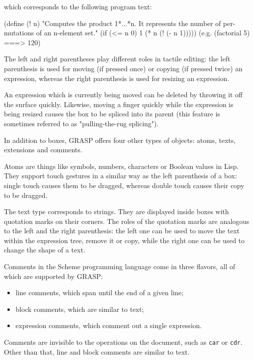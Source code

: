 \documentclass[sigconf]{acmart}
\newenvironment{Snippet}{\Verbatim[samepage=true]}{\endVerbatim}
\begin{document}
which corresponds to the following program text:

\begin{Snippet}
(define (! n)
"Computes the product 1*...*n.
It represents the number of per-
mutations of an n-element set."
  (if (<= n 0)
      1
      (* n (! (- n 1))))) 
(e.g. (factorial 5) ===> 120)
\end{Snippet}

The left and right parentheses play different roles in 
tactile editing: the left parenthesis is used for moving
(if pressed once) or copying (if pressed twice) an expression,
whereas the right parenthesis is used for resizing an expression.

An expression which is currently being moved can be deleted
by throwing it off the surface quickly. Likewise, moving
a finger quickly while the expression is being resized
causes the box to be spliced into its parent (this feature
is sometimes referred to as "pulling-the-rug splicing").

In addition to boxes, GRASP offers four other types
of objects: atoms, texts, extensions and comments.

Atoms are things like symbols, numbers, characters
or Boolean values in Lisp. They support touch
gestures in a similar way as the left parenthesis
of a box: single touch causes them to be dragged,
whereas double touch causes their copy to be dragged.

The text type corresponds to strings. They are 
displayed inside boxes with quotation marks
on their corners. The roles of the quotation
marks are analogous to the left and the right
parenthesis: the left one can be used to
move the text within the expression tree,
remove it or copy, while the right one can be used
to change the shape of a text.

Comments in the Scheme programming language come in
three flavors, all of which are supported by GRASP:
\begin{itemize}
\item line comments, which span until the end of a given line;
\item block comments, which are similar to text;
\item expression comments, which comment out a single expression.
\end{itemize}

Comments are invisible to the operations
on the document, such as \texttt{car} or \texttt{cdr}. 
Other than that, line and block comments are similar to text.
\end{document}
